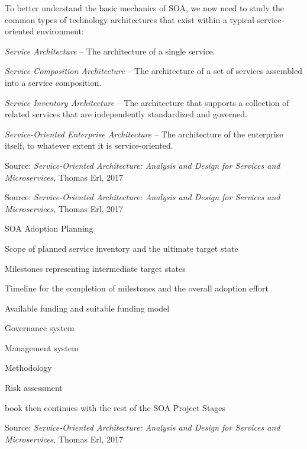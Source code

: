 \documentclass[Screen16to9,17pt]{foils}
\begin{document}
To better understand the basic mechanics of SOA, we now need to study the common types of technology architectures that exist within a typical service-oriented
environment:
\begin{list2}
\item \emph{Service Architecture} -- The architecture of a single service.
\item \emph{Service Composition Architecture} -- The architecture of a set of services assembled into a service composition.
\item \emph{Service Inventory Architecture} -- The architecture that supports a collection of related services that are independently standardized and governed.
\item \emph{Service-Oriented Enterprise Architecture} -- The architecture of the enterprise itself, to whatever extent it is service-oriented.
\end{list2}

Source: \emph{Service‑Oriented Architecture: Analysis and Design for Services and Microservices}, Thomas Erl, 2017




Source: \emph{Service‑Oriented Architecture: Analysis and Design for Services and Microservices}, Thomas Erl, 2017




SOA Adoption Planning
\begin{list2}
\item Scope of planned service inventory and the ultimate target state
\item Milestones representing intermediate target states
\item Timeline for the completion of milestones and the overall adoption effort
\item Available funding and suitable funding model
\item Governance system
\item Management system
\item Methodology
\item Risk assessment
\end{list2}
book then continues with the rest of the SOA Project Stages

Source: \emph{Service‑Oriented Architecture: Analysis and Design for Services and Microservices}, Thomas Erl, 2017
\end{document}
